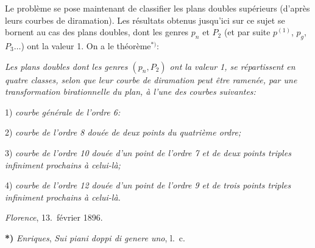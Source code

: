 \documentclass{article}
\begin{document}
Le problème se pose maintenant de classifier les plans doubles supérieurs (d'après leurs courbes de diramation). Les résultats obtenus jusqu'ici sur ce sujet se bornent au cas des plans doubles, dont les genres $p_{n}$ et $P_{2}$ (et par suite $p^{(1)}$, $p_{g}$, $P_{3} \ldots$) ont la valeur 1. On a le théorème${}^{*)}$:

\emph{Les plans doubles dont les genres $(p_{n}, P_{2})$ ont la valeur 1, se répartissent en quatre classes, selon que leur courbe de diramation peut être ramenée, par une transformation birationnelle du plan, à l'une des courbes suivantes:}

1) \emph{courbe générale de l'ordre 6:}

2) \emph{courbe de l'ordre 8 douée de deux points du quatrième ordre;}

3) \emph{courbe de l'ordre 10 douée d'un point de l'ordre 7 et de deux points triples infiniment prochains à celui-là;}

4) \emph{courbe de l'ordre 12 douée d'un point de l'ordre 9 et de trois points triples infiniment prochains à celui-là.}

\emph{Florence}, 13.\ février 1896.

\textbf{*)} \emph{Enriques}, \emph{Sui piani doppi di genere uno}, l.\ c.
\end{document}
